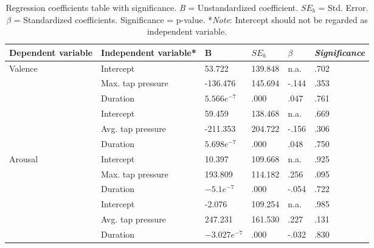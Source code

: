 \begin{table}[ht]
\centering
\begin{tabularx}{\textwidth}{@{}llZZZZ@{}}
\textbf{Dependent variable} & \textbf{Independent variable*} & B              & $SE_b$  & $\beta$ & \textit{Significance} \\ \midrule
Valence                     & Intercept                      & 53.722         & 139.848 & n.a.    & .702                  \\
                            & Max. tap pressure              & -136.476       & 145.694 & -.144   & .353                  \\
                            & Duration                       & $5.566e^{-7}$  & .000    & .047    & .761                  \\ \cmidrule(l){2-6} 
                            & Intercept                      & 59.459         & 138.468 & n.a.    & .669                  \\
                            & Avg. tap pressure              & -211.353       & 204.722 & -.156   & .306                  \\
                            & Duration                       & $5.698e^{-7}$  & .000    & .048    & .750                  \\ \midrule
Arousal                     & Intercept                      & 10.397         & 109.668 & n.a.    & .925                  \\
                            & Max. tap pressure              & 193.809        & 114.182 & .256    & .095                  \\
                            & Duration                       & $-5.1e^{-7}$   & .000    & -.054   & .722                  \\ \cmidrule(l){2-6} 
                            & Intercept                      & -2.076         & 109.254 & n.a.    & .985                  \\
                            & Avg. tap pressure              & 247.231        & 161.530 & .227    & .131                  \\
                            & Duration                       & $-3.027e^{-7}$ & .000    & -.032   & .830                 
\end{tabularx}
\caption{Regression coefficients table with significance. \textit{B} = Unstandardized coefficient. \textit{$SE_b$} = Std. Error. \textit{$\beta$} = Standardized coefficients. Significance = p-value. *\textit{Note}: Intercept should not be regarded as independent variable.}
\label{tab:regression_coefficients}
\end{table}